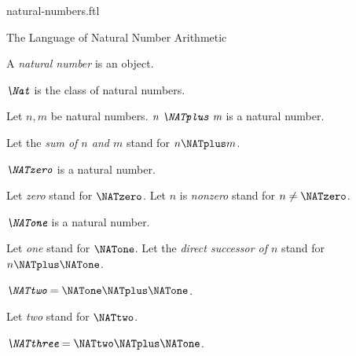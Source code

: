 \documentclass{naproche-library}
\begin{document}
\begin{smodule}[title=Natural Numbers]{natural-numbers.ftl}

\begin{sfragment}{The Language of Natural Number Arithmetic}
  \begin{signature}[forthel,id=ARITHMETIC_01_3074681254969344]
    A \emph{natural number} is an object.
  \end{signature}

  \begin{definition}[forthel,id=ARITHMETIC_01_7367148418629632]
    $\emph{\Nat}$ is the class of natural numbers.
  \end{definition}

  \begin{signature}[forthel,id=ARITHMETIC_01_1567933815848960]
    Let $n, m$ be natural numbers.
    $\emph{n \NATplus m}$ is a natural number.

    Let the \emph{sum of $n$ and $m$} stand for $n \NATplus m$.
  \end{signature}

  \begin{signature}[forthel,id=ARITHMETIC_01_7633304715001856]
    $\emph{\NATzero}$ is a natural number.

    Let \emph{zero} stand for $\NATzero$.
    Let $n$ is \emph{nonzero} stand for $n \neq \NATzero$.
  \end{signature}

  \begin{signature}[forthel,id=ARITHMETIC_01_1200254566985232]
    $\emph{\NATone}$ is a natural number.

    Let \emph{one} stand for $\NATone$.
    Let the \emph{direct successor of $n$} stand for $n \NATplus \NATone$.
  \end{signature}

  \begin{definition}[forthel,id=ARITHMETIC_01_4584236572999680]
    $\emph{\NATtwo} = \NATone \NATplus \NATone$.

    Let \emph{two} stand for $\NATtwo$.
  \end{definition}

  \begin{definition}[forthel,id=ARITHMETIC_01_3836725109456896]
    $\emph{\NATthree} = \NATtwo \NATplus \NATone$.


\end{definition}
\end{sfragment}
\end{smodule}
\end{document}

